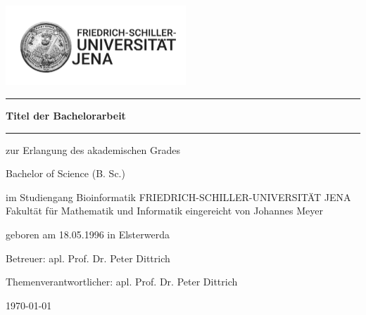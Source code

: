 \begin{titlepage}
	\thispagestyle{empty}
	\newcommand{\Rule}{\rule{\textwidth}{1mm}}
	\begin{center}
		\includegraphics[height=30mm]{./Bilder/HanfriedLogo}
		\Rule \vspace{5mm}
		\onehalfspacing \LARGE \textbf{Titel der Bachelorarbeit}
		\vspace{1mm} \Rule
		\vfill
		\textbf{}\par
		zur Erlangung des akademischen Grades\par
		Bachelor of Science (B. Sc.)\par
		im Studiengang Bioinformatik
		\vfill
		\LARGE \doublespacing FRIEDRICH-SCHILLER-UNIVERSITÄT JENA\newline
		\large Fakultät für Mathematik und Informatik
		\vfill \singlespacing
		eingereicht von Johannes Meyer\par
		geboren am 18.05.1996 in Elsterwerda\par
		\vfill
		Betreuer: apl. Prof. Dr. Peter Dittrich\par
		Themenverantwortlicher: apl. Prof. Dr. Peter Dittrich\par
		\vfill
		\today  %
	\end{center}
\end{titlepage}